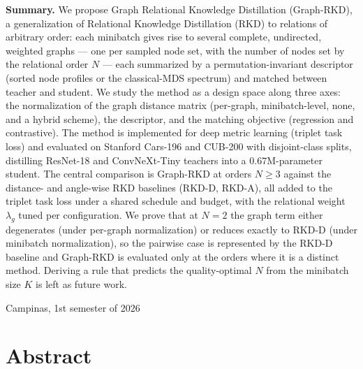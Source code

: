 \documentclass[11pt,letterpaper]{article}
\newcommand{\submissionDate}{Campinas, 1st semester of 2026}
\begin{document}
\begin{titlepage}
    \begin{minipage}{0.88\textwidth}
        \small
        \textbf{Summary.} %
        We propose Graph Relational Knowledge Distillation (Graph-RKD), a
        generalization of Relational Knowledge Distillation (RKD) to relations of
        arbitrary order: each minibatch gives rise to several complete, undirected,
        weighted graphs --- one per sampled node set, with the number of nodes set
        by the relational order $N$ --- each summarized by a permutation-invariant
        descriptor (sorted node profiles or the classical-MDS spectrum) and matched
        between teacher and student. We study the method as a design space along
        three axes: the normalization of the graph distance matrix (per-graph,
        minibatch-level, none, and a hybrid scheme), the descriptor, and the
        matching objective (regression and contrastive). The method is implemented
        for deep metric learning (triplet task loss) and evaluated on Stanford
        Cars-196 and CUB-200 with disjoint-class splits, distilling ResNet-18 and
        ConvNeXt-Tiny teachers into a $0.67$M-parameter student. The central
        comparison is Graph-RKD at orders $N \geq 3$ against the distance- and
        angle-wise RKD baselines (RKD-D, RKD-A), all added to the triplet task
        loss under a shared schedule and budget, with the relational weight
        $\lambda_g$ tuned per configuration. We prove that at $N = 2$ the graph
        term either degenerates (under per-graph normalization) or reduces exactly
        to RKD-D (under minibatch normalization), so the pairwise case is
        represented by the RKD-D baseline and Graph-RKD is evaluated only at the
        orders where it is a distinct method. Deriving a rule that predicts the
        quality-optimal $N$ from the minibatch size $K$ is left as future work.
    \end{minipage}

    \vfill
    \submissionDate
\end{titlepage}

\section*{Abstract}
\end{document}
